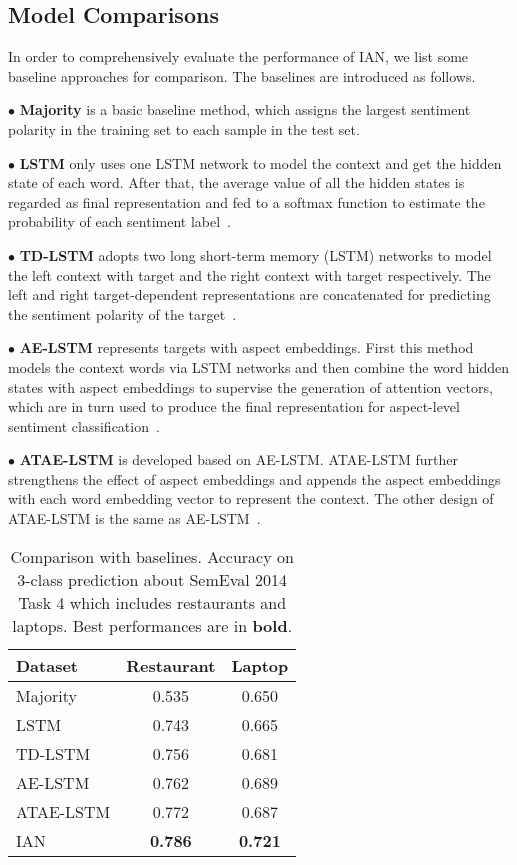 \documentclass{article}
\begin{document}
\subsection{Model Comparisons}
In order to comprehensively evaluate the performance of IAN, we list some baseline approaches for comparison.
The baselines are introduced as follows.

$\bullet$ \textbf{Majority} is a basic baseline method, which assigns the largest sentiment polarity in the training set to each sample in the test set.

$\bullet$ \textbf{LSTM} only uses one LSTM network to model the context and get the hidden state of each word. After that, the average value of all the hidden states is regarded as final representation  and fed to a softmax function to estimate the probability of each sentiment label~\cite{wang2016attention}.

$\bullet$ \textbf{TD-LSTM} adopts two  long short-term memory (LSTM) networks to model the left context with target and the right context with target respectively.
The left and right target-dependent representations are concatenated for predicting the sentiment polarity of the target~\cite{tang2015effective}.

$\bullet$ \textbf{AE-LSTM} represents targets with aspect embeddings. First this method models the context words via LSTM networks and then combine the word hidden states with aspect embeddings to supervise the generation of attention vectors, which are in turn used to produce the final representation for aspect-level sentiment classification~\cite{wang2016attention}. 

$\bullet$ \textbf{ATAE-LSTM} is developed based on AE-LSTM.  ATAE-LSTM further strengthens the effect of aspect embeddings and  appends the aspect embeddings with each word embedding  vector to represent the context. The other design of ATAE-LSTM is the same as AE-LSTM~\cite{wang2016attention}.

\begin{table}[tbp]
	\begin{center}
    		\begin{tabular}{|l|c|c|}
			\hline
			Dataset           &Restaurant        &Laptop          \\ \hline \hline
			Majority          &0.535              &0.650   			 \\ \hline
			LSTM 	       	  &0.743              &0.665             \\ \hline
			TD-LSTM           &0.756	          &0.681             \\ \hline
			AE-LSTM           &0.762 	          &0.689             \\ \hline
			ATAE-LSTM         &0.772	          &0.687             \\ \hline
			IAN               &\textbf{0.786}     &\textbf{0.721}    \\ \hline
		\end{tabular}
		\caption{Comparison with baselines. Accuracy on 3-class prediction about SemEval 2014 Task 4 which includes restaurants and laptops. Best performances are in \textbf{bold}.}
		\label{tab:result}
	\end{center}
\end{table}
\end{document}
